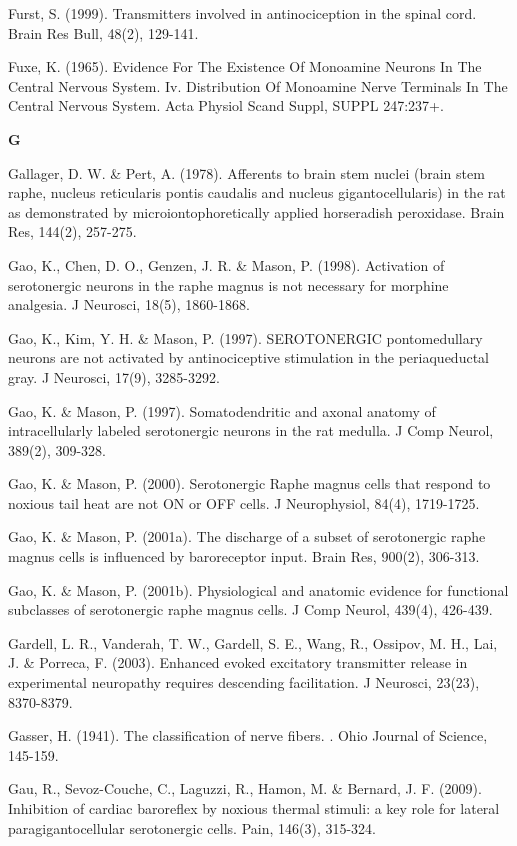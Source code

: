 \documentclass[a4paper,12pt,twoside]{report}
\begin{document}
\begin{singlespacing}
\begin{footnotesize}
Furst, S. (1999). Transmitters involved in antinociception in the spinal cord. Brain Res Bull, 48(2), 129-141.

Fuxe, K. (1965). Evidence For The Existence Of Monoamine Neurons In The Central Nervous System. Iv. Distribution Of Monoamine Nerve Terminals In The Central Nervous System. Acta Physiol Scand Suppl, SUPPL 247:237+.

\medskip
\begin{Large}\textbf{G}\end{Large}

Gallager, D. W. \& Pert, A. (1978). Afferents to brain stem nuclei (brain stem raphe, nucleus reticularis pontis caudalis and nucleus gigantocellularis) in the rat as demonstrated by microiontophoretically applied horseradish peroxidase. Brain Res, 144(2), 257-275.

Gao, K., Chen, D. O., Genzen, J. R. \& Mason, P. (1998). Activation of serotonergic neurons in the raphe magnus is not necessary for morphine analgesia. J Neurosci, 18(5), 1860-1868.

Gao, K., Kim, Y. H. \& Mason, P. (1997). SEROTONERGIC pontomedullary neurons are not activated by antinociceptive stimulation in the periaqueductal gray. J Neurosci, 17(9), 3285-3292.

Gao, K. \& Mason, P. (1997). Somatodendritic and axonal anatomy of intracellularly labeled serotonergic neurons in the rat medulla. J Comp Neurol, 389(2), 309-328.

Gao, K. \& Mason, P. (2000). Serotonergic Raphe magnus cells that respond to noxious tail heat are not ON or OFF cells. J Neurophysiol, 84(4), 1719-1725.

Gao, K. \& Mason, P. (2001a). The discharge of a subset of serotonergic raphe magnus cells is influenced by baroreceptor input. Brain Res, 900(2), 306-313.

Gao, K. \& Mason, P. (2001b). Physiological and anatomic evidence for functional subclasses of serotonergic raphe magnus cells. J Comp Neurol, 439(4), 426-439.

Gardell, L. R., Vanderah, T. W., Gardell, S. E., Wang, R., Ossipov, M. H., Lai, J. \& Porreca, F. (2003). Enhanced evoked excitatory transmitter release in experimental neuropathy requires descending facilitation. J Neurosci, 23(23), 8370-8379.

Gasser, H. (1941). The classification of nerve fibers. . Ohio Journal of Science, 145-159.

Gau, R., Sevoz-Couche, C., Laguzzi, R., Hamon, M. \& Bernard, J. F. (2009). Inhibition of cardiac baroreflex by noxious thermal stimuli: a key role for lateral paragigantocellular serotonergic cells. Pain, 146(3), 315-324.


\end{footnotesize}
\end{singlespacing}
\end{document}
